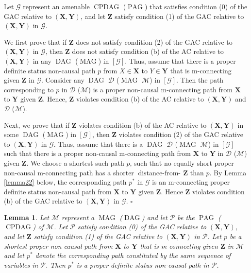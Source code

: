 \documentclass[]{article}
\DeclareMathOperator{\CPDAG}{CPDAG}
\DeclareMathOperator{\DAG}{DAG}
\DeclareMathOperator{\MAG}{MAG}
\DeclareMathOperator{\PAG}{PAG}
\DeclareMathOperator{\distancefrom}{distance-from-\!}
\newtheorem{lemma}[theorem]{Lemma}
\theoremstyle{definition}
\newenvironment{prooflemmaeqb}{\noindent{\bf Proof of Lemma \ref{lemmaequivalenceofcondb}:}}%
{\hfill $\square$}
\theoremstyle{remark}
\newcommand{\g}[1][G]{\mathcal{#1}}
\newcommand{\pstar}[1][p]{{#1}^{*}}
\begin{document}
\begin{prooflemmaeqb}
   Let $\g$ represent an amenable $\CPDAG$ ($\PAG$) that satisfies condition (0) of the GAC relative to $(\mathbf{X},\mathbf{Y})$, and let $\mathbf{Z}$ satisfy condition (1) of the GAC relative to $(\mathbf{X},\mathbf{Y})$ in $\g$.

   We first prove that if $\mathbf{Z}$ does not satisfy condition (2) of the GAC relative to $(\mathbf{X},\mathbf{Y})$ in $\g$, then $\mathbf{Z}$ does not satisfy condition (b) of the AC relative to $(\mathbf{X},\mathbf{Y})$ in any $\DAG$ ($\MAG$) in $[\g]$.
   Thus, assume that there is a proper definite status non-causal path $p$ from $X \in \mathbf{X}$ to $Y \in \mathbf{Y}$ that is m-connecting given $\mathbf{Z}$ in $\g$. Consider any $\DAG$ $\g[D]$ ($\MAG$ $\g[M]$) in $[\g]$. Then the path corresponding to $p$ in $\g[D]$ ($\g[M]$) is a proper non-causal m-connecting path from $\mathbf{X}$ to $\mathbf{Y}$ given $\mathbf{Z}$. Hence,
   $\mathbf{Z}$ violates condition (b) of the AC relative to $(\mathbf{X},\mathbf{Y})$ and $\g[D]$ ($\g[M]$).

   Next, we prove that if $\mathbf{Z}$ violates condition (b) of the AC relative to $(\mathbf{X},\mathbf{Y})$ in some $\DAG$ ($\MAG$) in $[\g]$, then $\mathbf{Z}$ violates condition (2) of the GAC relative to $(\mathbf{X},\mathbf{Y})$ in $\g$.
   Thus, assume that there is a $\DAG$ $\g[D]$ ($\MAG$ $\g[M]$) in $[\g]$ such that there is a proper non-causal m-connecting path from $\mathbf{X}$ to $\mathbf{Y}$ in $\g[D]$ ($\g[M]$) given $\mathbf{Z}$.
   We choose a shortest such path $p$, such that no equally short proper non-causal m-connecting path has a shorter $\distancefrom{\mathbf{Z}}$ than $p$. By Lemma \ref{lemma22} below, the corresponding path $\pstar$ in $\g$ is an m-connecting proper definite status non-causal path from $\mathbf{X}$ to $\mathbf{Y}$ given $\mathbf{Z}$. Hence $\mathbf{Z}$ violates condition (b) of the GAC relative to $(\mathbf{X},\mathbf{Y})$ in $\g$.
\end{prooflemmaeqb}

\begin{lemma}
   Let $\g[M]$ represent a $\MAG$ ($\DAG$) and let $\g[P]$ be the $\PAG$ ($\CPDAG$) of $\g[M]$. Let $\g[P]$ satisfy condition (0) of the GAC relative to $(\mathbf{X},\mathbf{Y})$,  and let $\mathbf{Z}$ satisfy condition (1) of the GAC relative to $(\mathbf{X},\mathbf{Y})$ in $\g[P]$. Let $p$ be a shortest proper non-causal path from $\mathbf{X}$ to $\mathbf{Y}$ that is m-connecting given $\mathbf{Z}$ in $\g[M]$ and let $\pstar$ denote the corresponding path constituted by the same sequence of variables in $\g[P]$. Then $\pstar$ is a proper definite status non-causal path in $\g[P]$.
   \label{lemma11}
\end{lemma}
\end{document}
